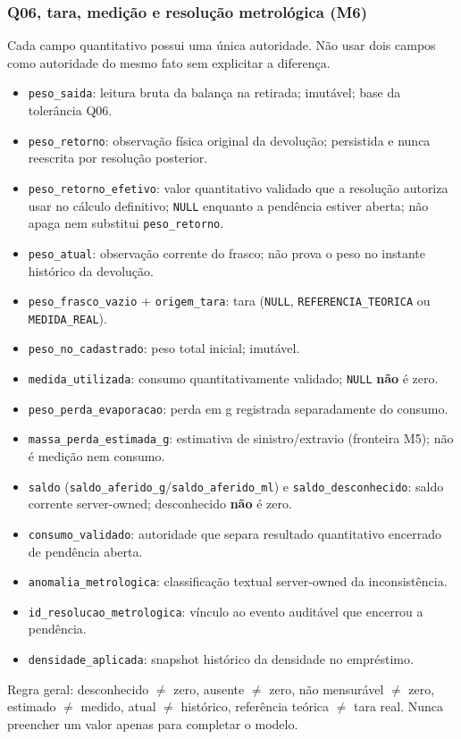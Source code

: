 \subsubsection{Q06, tara, medição e resolução metrológica (M6)}
\begin{regra}
Cada campo quantitativo possui uma única autoridade. Não usar dois campos como autoridade do mesmo fato sem explicitar a diferença.
\begin{itemize}
    \item \texttt{peso\_saida}: leitura bruta da balança na retirada; imutável; base da tolerância Q06.
    \item \texttt{peso\_retorno}: observação física original da devolução; persistida e nunca reescrita por resolução posterior.
    \item \texttt{peso\_retorno\_efetivo}: valor quantitativo validado que a resolução autoriza usar no cálculo definitivo; \texttt{NULL} enquanto a pendência estiver aberta; não apaga nem substitui \texttt{peso\_retorno}.
    \item \texttt{peso\_atual}: observação corrente do frasco; não prova o peso no instante histórico da devolução.
    \item \texttt{peso\_frasco\_vazio} + \texttt{origem\_tara}: tara (\texttt{NULL}, \texttt{REFERENCIA\_TEORICA} ou \texttt{MEDIDA\_REAL}).
    \item \texttt{peso\_no\_cadastrado}: peso total inicial; imutável.
    \item \texttt{medida\_utilizada}: consumo quantitativamente validado; \texttt{NULL} \textbf{não} é zero.
    \item \texttt{peso\_perda\_evaporacao}: perda em g registrada separadamente do consumo.
    \item \texttt{massa\_perda\_estimada\_g}: estimativa de sinistro/extravio (fronteira M5); não é medição nem consumo.
    \item \texttt{saldo} (\texttt{saldo\_aferido\_g}/\texttt{saldo\_aferido\_ml}) e \texttt{saldo\_desconhecido}: saldo corrente server-owned; desconhecido \textbf{não} é zero.
    \item \texttt{consumo\_validado}: autoridade que separa resultado quantitativo encerrado de pendência aberta.
    \item \texttt{anomalia\_metrologica}: classificação textual server-owned da inconsistência.
    \item \texttt{id\_resolucao\_metrologica}: vínculo ao evento auditável que encerrou a pendência.
    \item \texttt{densidade\_aplicada}: snapshot histórico da densidade no empréstimo.
\end{itemize}
Regra geral: desconhecido $\neq$ zero, ausente $\neq$ zero, não mensurável $\neq$ zero, estimado $\neq$ medido, atual $\neq$ histórico, referência teórica $\neq$ tara real. Nunca preencher um valor apenas para completar o modelo.
\end{regra}

